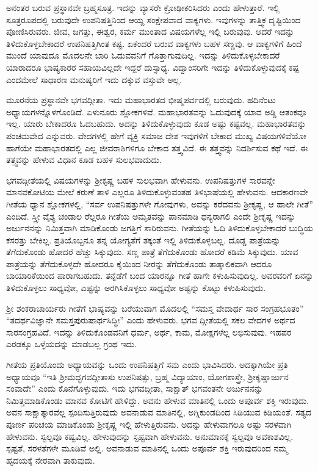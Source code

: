 ಅನಂತರ ಬರುವ ಪ್ರಸ್ಥಾನವೇ ಬ್ರಹ್ಮಸೂತ್ರ. ಇದನ್ನು ವ್ಯಾಸರೇ ಕ್ರೋಢೀಕರಿಸಿದರು ಎಂದು ಹೇಳುತ್ತಾರೆ. ಇಲ್ಲಿ ಸೂತ್ರರೂಪದಲ್ಲಿ ಬರುವುದೇ ಉಪನಿಷತ್ತಿನಿಂದ ಆಯ್ದ ಸಂಕ್ಷೇಪವಾದ ವಾಕ್ಯಗಳು. ಇವುಗಳನ್ನು ತಾತ್ತ್ವಿಕ ದೃಷ್ಟಿಯಿಂದ ಪೋಣಿಸಿರುವರು. ಜೀವ, ಜಗತ್ತು, ಈಶ್ವರ, ಕರ್ಮ ಮುಂತಾದ ವಿಷಯಗಳೆಲ್ಲ ಇಲ್ಲಿ ಬರುವುವು. ಆದರೆ ಇದನ್ನು ತಿಳಿದುಕೊಳ್ಳಬೇಕಾದರೆ ಉಪನಿಷತ್ತಿಗಿಂತ ಕಷ್ಟ. ಏಕೆಂದರೆ ಬರುವ ವಾಕ್ಯಗಳು ಬಹಳ ಸಣ್ಣವು. ಆ ವಾಕ್ಯಗಳಿಗೆ ಹಿಂದೆ ಮುಂದೆ ಯಾವುದೂ ಮೊದಲನೇ ಬಾರಿ ಓದುವವನಿಗೆ ಗೊತ್ತಾಗುವುದಿಲ್ಲ. ಇದನ್ನು ತಿಳಿದುಕೊಳ್ಳಬೇಕಾದರೆ ಯಾರಾದರೂ ಭಾಷ್ಯಕಾರರ ಸಹಾಯವಿಲ್ಲದೇ ಇದ್ದರೆ ದುಸ್ಸಾಧ್ಯ. ವಿದ್ವಾಂಸರಿಗೇ ಇದನ್ನು ತಿಳಿದುಕೊಳ್ಳುವುದಕ್ಕೆ ಕಷ್ಟ ಎಂದಮೇಲೆ ಸಾಧಾರಣ ಮನುಷ್ಯರಿಗೆ ಇದು ದಕ್ಕುವ ವಸ್ತುವೇ ಅಲ್ಲ.

ಮೂರನೆಯ ಪ್ರಸ್ಥಾನವೇ ಭಗವದ್ಗೀತಾ. ಇದು ಮಹಾಭಾರತದ ಭೀಷ್ಮಪರ್ವದಲ್ಲಿ ಬರುವುದು. ಹದಿನೆಂಟು ಅಧ್ಯಾಯಗಳನ್ನೊಳಗೊಂಡಿದೆ. ಏಳುನೂರು ಶ್ಲೋಕಗಳಿವೆ. ಮಹಾಭಾರತವನ್ನು ಓದುವುದಕ್ಕೆ ಯಾವ ಅಡ್ಡಿ ಆತಂಕವೂ ಇಲ್ಲ. ಯಾರು ಬೇಕಾದರೂ ಓದಬಹುದು. ಅದನ್ನು ತಿಳಿದುಕೊಳ್ಳುವುದು ಕೂಡ ಅಷ್ಟು ಕಷ್ಟವಲ್ಲ. ಮಹಾಭಾರತವನ್ನು ಪಂಚಮವೇದ ಎನ್ನುವರು. ವೇದಗಳಲ್ಲಿ ಹೇಗೆ ವ್ಯಕ್ತಿ ಸಮಾಜ ದೇಶ ಇವುಗಳಿಗೆ ಬೇಕಾದ ಮುಖ್ಯ ವಿಷಯಗಳಿವೆಯೋ ಹಾಗೆಯೇ ಮಹಾಭಾರತದಲ್ಲಿ ಎಲ್ಲ ಜೀವರಾಶಿಗಳಿಗೂ ಬೇಕಾದ ತತ್ತ್ವವಿದೆ. ಈ ತತ್ತ್ವವನ್ನು ನಿದರ್ಶಿಸುವ ಕಥೆ ಇದೆ. ಈ ತತ್ತ್ವವನ್ನು ಹೇಳುವ ವಿಧಾನ ಕೂಡ ಬಹಳ ಸುಲಭವಾದುದು.

ಭಗವದ್ಗೀತೆಯಲ್ಲಿ ವಿಷಯಗಳನ್ನು ಶ‍್ರೀಕೃಷ್ಣ ಬಹಳ ಸುಲಭವಾಗಿ ಹೇಳುವನು. ಉಪನಿಷತ್ತುಗಳ ಸಾರವನ್ನೇ ಮಾನವಕೋಟಿಯ ಮೇಲೆ ಕರುಣೆ ತಾಳಿ ಎಲ್ಲರೂ ತಿಳಿದುಕೊಳ್ಳುವಂತಹ ತಿಳಿಭಾಷೆಯಲ್ಲಿ ಹೇಳುವನು. ಆದಕಾರಣವೇ ಗೀತೆಯ ಧ್ಯಾನ ಶ್ಲೋಕಗಳಲ್ಲಿ, “ಸರ್ವ ಉಪನಿಷತ್ತುಗಳೇ ಗೋವುಗಳು, ಅವನ್ನು ಕರೆದವನು ಶ‍್ರೀಕೃಷ್ಣ, ಆ ಹಾಲೇ ಗೀತೆ” ಎಂದಿದೆ. ಸ್ತ್ರೀ ವೈಶ್ಯ ಚಂಡಾಲ ರೆಲ್ಲರೂ ಗೀತೆಯ ಅಮೃತವನ್ನು ಪಾನಮಾಡಿ ಧನ್ಯರಾಗಲಿ ಎಂದೇ ಶ‍್ರೀಕೃಷ್ಣ ಇದನ್ನು ಅರ್ಜುನನನ್ನು ನಿಮಿತ್ತವಾಗಿ ಮಾಡಿಕೊಂಡು ಜಗತ್ತಿಗೆ ಸಾರಿರುವನು. ಗೀತೆಯನ್ನು ಓದಿ ತಿಳಿದುಕೊಳ್ಳಬೇಕಾದರೆ ಬುದ್ಧಿಯ ಕಸರತ್ತು ಬೇಕಿಲ್ಲ. ಪ್ರತಿಯೊಬ್ಬನೂ ತನ್ನ ಯೋಗ್ಯತೆಗೆ ತಕ್ಕಂತೆ ಇಲ್ಲಿ ತಿಳಿದುಕೊಳ್ಳಬಲ್ಲ. ದೊಡ್ಡ ಪಾತ್ರೆಯನ್ನು ತೆಗೆದುಕೊಂಡು ಹೋದರೆ ಹೆಚ್ಚು ಸಿಕ್ಕುವುದು. ಸಣ್ಣ ಪಾತ್ರೆ ತೆಗೆದುಕೊಂಡು ಹೋದರೆ ಕಡಿಮೆ ಸಿಕ್ಕುವುದು. ಯಾವ ಪಾತ್ರೆಯನ್ನು ತೆಗೆದುಕೊಳ್ಳದೇ ಹೋದರೂ ಕೈಯಿಂದ ನೀರನ್ನು ತೆಗೆದುಕೊಂಡು ತಾತ್ಕಾಲಿಕವಾಗಿ ಆದರೂ ಬಾಯಾರಿಕೆಯಿಂದ ಪಾರಾಗಬಹುದು. ತನ್ನೆಡೆಗೆ ಬಂದ ಯಾರನ್ನೂ ಗೀತೆ ಹಾಗೇ ಕಳುಹಿಸುವುದಿಲ್ಲ. ಅವರವರಿಗೆ ಏನನ್ನು ತಿಳಿದುಕೊಳ್ಳಲು ಸಾಧ್ಯವೋ, ಎಷ್ಟನ್ನು ಅರಗಿಸಿಕೊಳ್ಳಲು ಸಾಧ್ಯವೋ ಅಷ್ಟನ್ನು ಕೊಟ್ಟು ಕಳುಹಿಸುವುದು.

ಶ‍್ರೀ ಶಂಕರಾಚಾರ್ಯರು ಗೀತೆಗೆ ಭಾಷ್ಯವನ್ನು ಬರೆಯುವಾಗ ಮೊದಲಲ್ಲಿ “ಸಮಸ್ತ ವೇದಾರ್ಥ ಸಾರ ಸಂಗ್ರಹಭೂತಂ” “ತದರ್ಥವಿಜ್ಞಾನೇ ಸಮಸ್ತಪುರುಷಾರ್ಥಸಿದ್ಧಿಃ” ಎಂದು ಹೇಳುವರು. ಭಗವ ದ್ಗೀತೆಯಲ್ಲಿ ಸಕಲ ವೇದಗಳ ಅರ್ಥದ ಸಾರಸಂಗ್ರಹವಿದೆ. ಇದನ್ನು ತಿಳಿದುಕೊಂಡವನಿಗೆ ಧರ್ಮ, ಅರ್ಥ, ಕಾಮ, ಮೋಕ್ಷಗಳೆಲ್ಲ ಲಭಿಸುವುವು. ಇಹಪರ ಎರಡಕ್ಕೂ ಒಳ್ಳೆಯದನ್ನು ಮಾಡಬಲ್ಲ ಗ್ರಂಥ ಇದು.

ಗೀತೆಯ ಪ್ರತಿಯೊಂದು ಅಧ್ಯಾಯವನ್ನು ಒಂದು ಉಪನಿಷತ್ತಿಗೆ ಸಮ ಎಂದು ಭಾವಿಸಿದರು. ಅದಕ್ಕಾಗಿಯೇ ಪ್ರತಿ ಅಧ್ಯಾಯವೂ “ಇತಿ ಶ‍್ರೀಮದ್ಭಗವದ್ಗೀತಾಸು ಉಪನಿಷತ್ಸು, ಬ್ರಹ್ಮ ವಿದ್ಯಾಯಾಂ, ಯೋಗಶಾಸ್ತ್ರೇ, ಶ‍್ರೀಕೃಷ್ಣಾರ್ಜುನ ಸಂವಾದೇ” ಎಂದು ಕೊನೆಗೊಳ್ಳುವುದು. ಇದು ಭಗವದ್ಗೀತಾ, ಸಾಕ್ಷಾತ್ ಭಗವಂತನೇ ಅರ್ಜುನನನ್ನು ನಿಮಿತ್ತಮಾಡಿಕೊಂಡು ಮಾನವ ಕೋಟಿಗೆ ಹೇಳಿದ್ದು. ಅವನು ಹೇಳುವ ಮಾತಿನಲ್ಲಿ ಒಂದು ಅಪೂರ್ವ ಶಕ್ತಿ ಇರುವುದು. ಅವನ ಸಾಕ್ಷಾತ್ಕಾರವೆಲ್ಲ ಸ್ಪಂದಿಸುತ್ತಿರುವುದು ಅವನಾಡುವ ಮಾತಿನಲ್ಲಿ, ಅಗ್ನಿಕುಂಡದಿಂದ ಸಿಡಿಯುವ ಕಿಡಿಯಂತೆ. ಸತ್ಯದ ಪೂರ್ಣ ಪರಿಚಯ ಮಾಡಿಕೊಂಡು ಶ‍್ರೀಕೃಷ್ಣ ಇಲ್ಲಿ ಹೇಳುತ್ತಿರುವನು. ಅದನ್ನು ಹೇಳುವಾಗಲೂ ಅಷ್ಟು ಸರಳವಾಗಿ ಹೇಳುವನು. ಸ್ವಲ್ಪವೂ ಕಷ್ವವಿಲ್ಲ. ಹೇಳುವುದನ್ನು ಸ್ಪಷ್ಟವಾಗಿ ಹೇಳುವನು. ಅನುಮಾನಕ್ಕೆ ಸ್ವಲ್ಪವೂ ಅವಕಾಶವಿಲ್ಲ. ಸ್ಪಷ್ಟತೆ, ಸರಳತೆಗಳೇ ಮೂಡಿವೆ ಅಲ್ಲಿ. ಅವನಾಡುವ ಮಾತಿನಲ್ಲಿ ಒಂದು ಅಪೂರ್ವ ಶಕ್ತಿ ಇರುವುದರಿಂದ ನಮ್ಮ ಹೃದಯಕ್ಕೆ ನೇರವಾಗಿ ತಾಕುವುದು.

